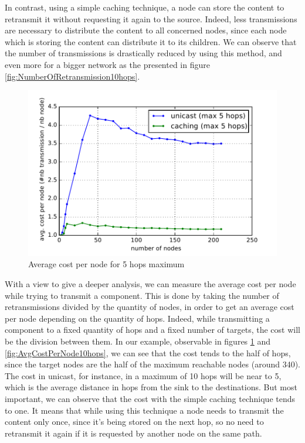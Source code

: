 In contrast, using a simple caching technique, a node can store the content to retransmit it without requesting it again to the source.
Indeed, less transmissions are necessary to distribute the content to all concerned nodes, since each node which is storing the content can distribute it to its children.
We can observe that the number of transmissions is drastically reduced by using this method, and even more for a bigger network as the presented in figure \ref{fig:NumberOfRetransmission10hops}.

\begin{figure}[]
	\centering
	\includegraphics[width=0.8 \columnwidth]{chapters/inter-node.images/avg-cost-per-node-5.pdf}
	\caption{Average cost per node for 5 hops maximum} \label{fig:AvgCostPerNode5hops}
\end{figure}

With a view to give a deeper analysis, we can measure the average cost per node while trying to transmit a component.
This is done by taking the number of retransmissions divided by the quantity of nodes, in order to get an average cost per node depending on the quantity of hops.
Indeed, while transmitting a component to a fixed quantity of hops and a fixed number of targets, the cost will be the division between them.
In our example, observable in figures \ref{fig:AvgCostPerNode5hops} and \ref{fig:AvgCostPerNode10hops}, we can see that the cost tends to the half of hops, since the target nodes are the half of the maximum reachable nodes (around 340).
The cost in unicast, for instance, in a maximum of 10 hops will be near to 5, which is the average distance in hops from the sink to the destinations.
But most important, we can observe that the cost with the simple caching technique tends to one.
It means that while using this technique a node needs to transmit the content only once, since it's being stored on the next hop, so no need to retransmit it again if it is requested by another node on the same path.

